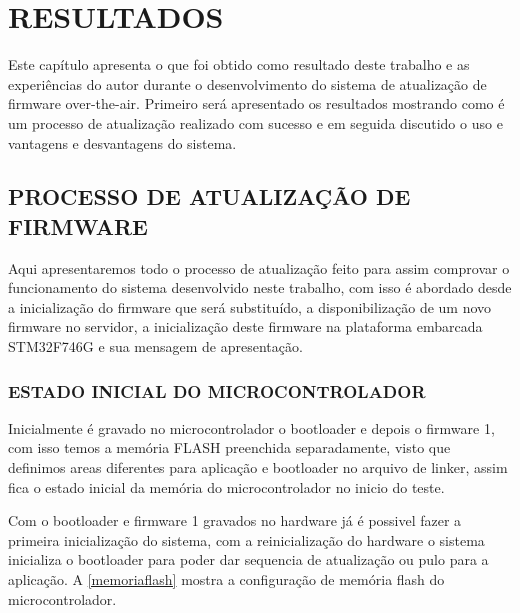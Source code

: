 \chapter{RESULTADOS}
\label{Chap:Resultados}

Este capítulo apresenta o que foi obtido como resultado deste trabalho e as experiências do autor durante o desenvolvimento do sistema de atualização de firmware over-the-air. Primeiro será apresentado os resultados mostrando como é um processo de atualização realizado com sucesso e em seguida discutido o uso e vantagens e desvantagens do sistema. 

\section{PROCESSO DE ATUALIZAÇÃO DE FIRMWARE}
Aqui apresentaremos todo o processo de atualização feito para assim comprovar o funcionamento do sistema desenvolvido neste trabalho, com isso é abordado desde a inicialização do firmware que será substituído, a disponibilização de um novo firmware no servidor, a inicialização deste firmware na plataforma embarcada STM32F746G e sua mensagem de apresentação.

\subsection{ESTADO INICIAL DO MICROCONTROLADOR}
Inicialmente é gravado no microcontrolador o bootloader e depois o firmware 1, com isso temos a memória FLASH preenchida separadamente, visto que definimos areas diferentes para aplicação e bootloader no arquivo de linker, assim fica o estado inicial da memória do microcontrolador no inicio do teste.

Com o bootloader e firmware 1 gravados no hardware já é possivel fazer a primeira inicialização do sistema, com a reinicialização do hardware o sistema inicializa o bootloader para poder dar sequencia de atualização ou pulo para a aplicação. A \autoref{memoriaflash} mostra a configuração de memória flash do microcontrolador.

